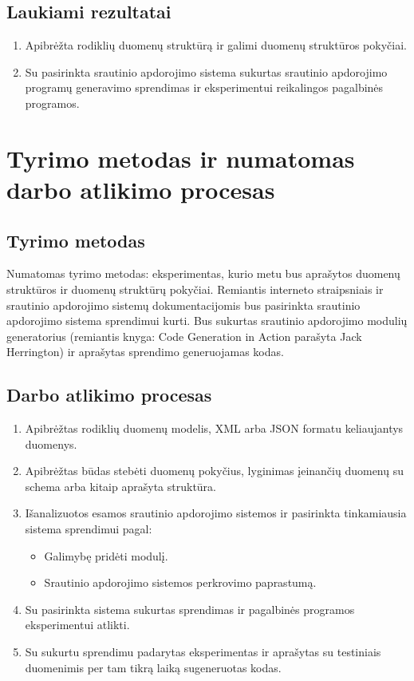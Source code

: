 \documentclass{VUMIFPSbakalaurinis}
\begin{document}
\subsection{Laukiami rezultatai}
\begin{enumerate}
    \item Apibrėžta rodiklių duomenų struktūrą ir galimi duomenų struktūros pokyčiai.
    \item Su pasirinkta srautinio apdorojimo sistema sukurtas srautinio apdorojimo programų generavimo sprendimas ir eksperimentui reikalingos pagalbinės programos. 
\end{enumerate}
\section{Tyrimo metodas ir numatomas darbo atlikimo procesas}

\subsection{Tyrimo metodas}
Numatomas tyrimo metodas: eksperimentas, kurio metu bus aprašytos duomenų struktūros ir duomenų struktūrų pokyčiai. Remiantis interneto straipsniais ir srautinio apdorojimo sistemų dokumentacijomis bus pasirinkta srautinio apdorojimo sistema sprendimui kurti. Bus sukurtas srautinio apdorojimo modulių generatorius (remiantis knyga: Code Generation in Action parašyta Jack Herrington) ir aprašytas sprendimo generuojamas kodas. \par 

\subsection{Darbo atlikimo procesas}
\begin{enumerate}
    \item Apibrėžtas rodiklių duomenų modelis, XML arba JSON formatu keliaujantys duomenys.
    \item Apibrėžtas būdas stebėti duomenų pokyčius, lyginimas įeinančių duomenų su schema arba kitaip aprašyta struktūra.
    \item Išanalizuotos esamos srautinio apdorojimo sistemos ir pasirinkta tinkamiausia sistema sprendimui pagal:
    	\begin{itemize}
		\item Galimybę pridėti modulį.
		\item Srautinio apdorojimo sistemos perkrovimo paprastumą.
	\end{itemize}
    \item Su pasirinkta sistema sukurtas sprendimas ir pagalbinės programos eksperimentui atlikti.
    \item Su sukurtu sprendimu padarytas eksperimentas ir aprašytas su testiniais duomenimis per tam tikrą laiką sugeneruotas kodas. 
\end{enumerate}
\end{document}
